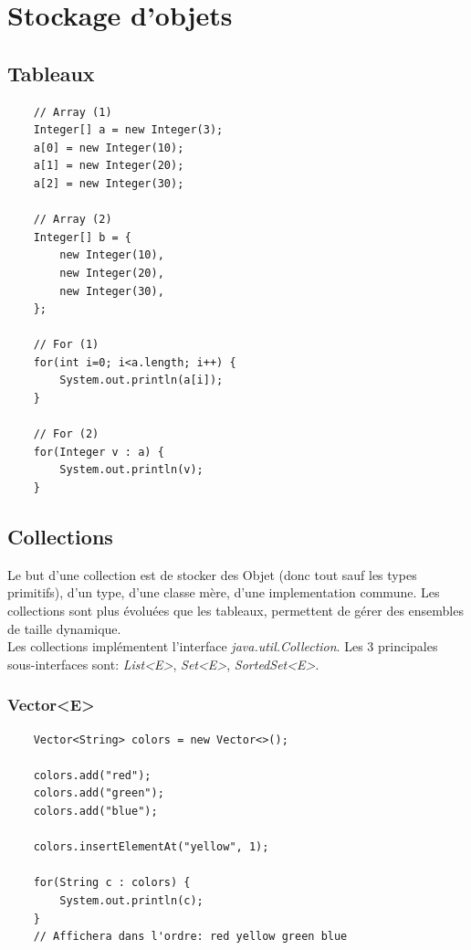 \documentclass[a4paper, 12pt, french]{article}
\begin{document}
	\section{Stockage d'objets}

	\subsection{Tableaux}

	\begin{lstlisting}
	// Array (1)
	Integer[] a = new Integer(3);
	a[0] = new Integer(10);
	a[1] = new Integer(20);
	a[2] = new Integer(30);

	// Array (2)
	Integer[] b = {
		new Integer(10),
		new Integer(20),
		new Integer(30),
	};

	// For (1)
	for(int i=0; i<a.length; i++) {	
		System.out.println(a[i]);
	}

	// For (2)
	for(Integer v : a) {
		System.out.println(v);
	}
	\end{lstlisting}

	\subsection{Collections}

	Le but d'une collection est de stocker des Objet (donc tout sauf les types primitifs), d'un type, d'une classe mère, d'une implementation commune. Les collections sont plus évoluées que les tableaux, permettent de gérer des ensembles de taille dynamique.\\

	Les collections implémentent l'interface \emph{java.util.Collection}. Les 3 principales sous-interfaces sont: \emph{List<E>}, \emph{Set<E>}, \emph{SortedSet<E>}.

	\subsubsection{Vector<E>}

	\begin{lstlisting}
	Vector<String> colors = new Vector<>();

	colors.add("red");
	colors.add("green");
	colors.add("blue");

	colors.insertElementAt("yellow", 1);

	for(String c : colors) {
		System.out.println(c);
	}
	// Affichera dans l'ordre: red yellow green blue
	\end{lstlisting}
\end{document}
